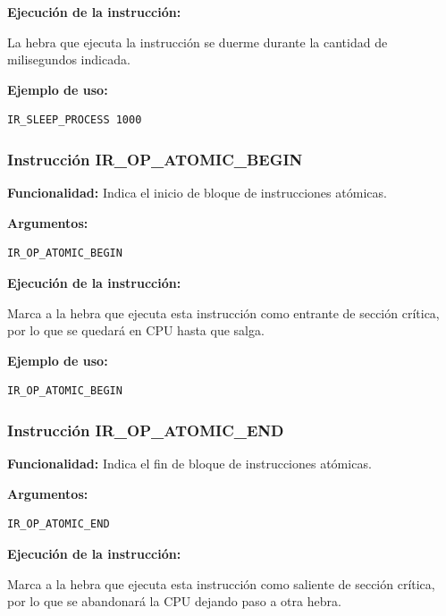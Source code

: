 \noindent
\textbf{Ejecución de la instrucción:}
\vspace{0.3cm}

\noindent
La hebra que ejecuta la instrucción se duerme durante la cantidad de milisegundos indicada.
\vspace{0.3cm}

\noindent
\textbf{Ejemplo de uso:}
\begin{verbatim}
IR_SLEEP_PROCESS 1000
\end{verbatim}

\subsubsection{Instrucción IR\_OP\_ATOMIC\_BEGIN}\label{subsubsec:IR_OP_ATOMIC_BEGIN}
\noindent
\textbf{Funcionalidad:} Indica el inicio de bloque de instrucciones atómicas.

\noindent
\textbf{Argumentos:}
\begin{verbatim}
IR_OP_ATOMIC_BEGIN
\end{verbatim}

\noindent
\textbf{Ejecución de la instrucción:}
\vspace{0.3cm}

\noindent
Marca a la hebra que ejecuta esta instrucción como entrante de sección crítica, por lo que se quedará en CPU hasta que salga.
\vspace{0.3cm}

\noindent
\textbf{Ejemplo de uso:}
\begin{verbatim}
IR_OP_ATOMIC_BEGIN
\end{verbatim}

\subsubsection{Instrucción IR\_OP\_ATOMIC\_END}\label{subsubsec:IR_OP_ATOMIC_END}
\noindent
\textbf{Funcionalidad:} Indica el fin de bloque de instrucciones atómicas.

\noindent
\textbf{Argumentos:}
\begin{verbatim}
IR_OP_ATOMIC_END
\end{verbatim}

\noindent
\textbf{Ejecución de la instrucción:}
\vspace{0.3cm}

\noindent
Marca a la hebra que ejecuta esta instrucción como saliente de sección crítica, por lo que se abandonará la CPU dejando paso a otra hebra.
\vspace{0.3cm}

